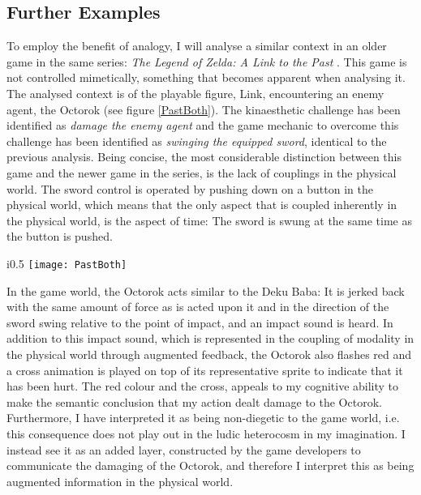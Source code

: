 \subsection{Further Examples}
To employ the benefit of analogy, I will analyse a similar context in an older game in the same series: \textit{The Legend of Zelda: A Link to the Past} \cite{linktothepast}. This game is not controlled mimetically, something that becomes apparent when analysing it. The analysed context is of the playable figure, Link, encountering an enemy agent, the Octorok (see figure \ref{PastBoth}). The kinaesthetic challenge has been identified as \textit{damage the enemy agent} and the game mechanic to overcome this challenge has been identified as \textit{swinging the equipped sword}, identical to the previous analysis. Being concise, the most considerable distinction between this game and the newer game in the series, is the lack of couplings in the physical world. The sword control is operated by pushing down on a button in the physical world, which means that the only aspect that is coupled inherently in the physical world, is the aspect of time: The sword is swung at the same time as the button is pushed.

\begin{wrapfigure}{i}{0.5\textwidth}
  \texttt{[image: PastBoth]}
  \caption{Damaging the Octorok by swinging the sword in The Legend of Zelda: A Link to the Past as analysed through the game mechanic focus and the challenge focus interpretations combined}
  \label{PastBoth}
\end{wrapfigure}

In the game world, the Octorok acts similar to the Deku Baba: It is jerked back with the same amount of force as is acted upon it and in the direction of the sword swing relative to the point of impact, and an impact sound is heard. In addition to this impact sound, which is represented in the coupling of modality in the physical world through augmented feedback, the Octorok also flashes red and a cross animation is played on top of its representative sprite to indicate that it has been hurt. The red colour and the cross, appeals to my cognitive ability to make the semantic conclusion that my action dealt damage to the Octorok. Furthermore, I have interpreted it as being non-diegetic to the game world, i.e. this consequence does not play out in the ludic heterocosm in my imagination. I instead see it as an added layer, constructed by the game developers to communicate the damaging of the Octorok, and therefore I interpret this as being augmented information in the physical world.

